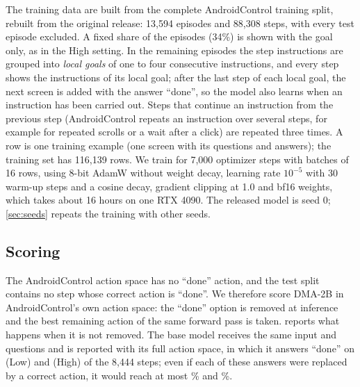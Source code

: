 \documentclass{article}
\newcommand{\ours}{DMA-2B}
\begin{document}
The training data are built from the complete AndroidControl training split, rebuilt from the original release:
13{,}594 episodes and 88{,}308 steps, with every test episode excluded. A fixed share of the episodes (34\%) is
shown with the goal only, as in the High setting. In the remaining episodes the step instructions are grouped into
\emph{local goals} of one to four consecutive instructions, and every step shows the instructions of its local
goal; after the last step of each local goal, the next screen is added with the answer ``done'', so the model also
learns when an instruction has been carried out. Steps that continue an instruction from the previous step
(AndroidControl repeats an instruction over several steps, for example for repeated scrolls or a wait after a
click) are repeated three times. A row is one training example (one screen with its questions and answers); the
training set has 116{,}139 rows. We train for 7{,}000 optimizer steps with batches of 16 rows, using 8-bit AdamW
without weight decay, learning rate $10^{-5}$ with 30 warm-up steps and a cosine decay, gradient clipping at 1.0 and
bf16 weights, which takes about 16 hours on one RTX 4090. The released model is seed 0; \cref{sec:seeds} repeats the
training with other seeds.

\subsection{Scoring}
The AndroidControl action space has no ``done'' action, and the test split contains no step whose correct action
is ``done''. We therefore score \ours{} in AndroidControl's own action space: the ``done'' option is removed at
inference and the best remaining action of the same forward pass is taken.  reports what
happens when it is not removed. The base model receives the same input and questions and is reported with its full action space, in which it
answers ``done'' on \BASEDONELOW{} (Low) and \BASEDONEHIGH{} (High) of the 8{,}444 steps; even if each of these
answers were replaced by a correct action, it would reach at most \BASEBOUNDLOW\% and \BASEBOUNDHIGH\%.
\end{document}
